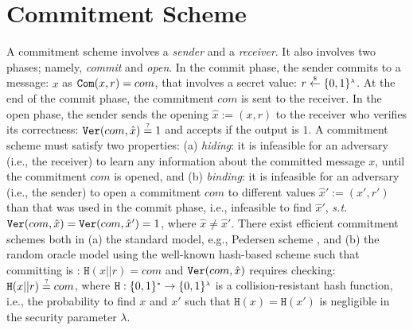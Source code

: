 



\section{Commitment Scheme}\label{subsec:commit}


 A commitment scheme involves a  \emph{sender} and a \emph{receiver}. It also  involves  two phases; namely, \emph{commit} and  \emph{open}. In the commit phase, the sender  commits to a message: $x$ as $\mathtt{Com}(x,r)=com$, that involves a secret value: $r\stackrel{\scriptscriptstyle\$}\leftarrow \{0,1\}^{\scriptscriptstyle\lambda}$. At the end of the commit phase,  the commitment ${com}$ is sent to the receiver. In the open phase, the sender sends the opening $\hat{x}:=(x, r)$ to the receiver who verifies its correctness: $\mathtt{Ver}({com},\hat{x})\stackrel{\scriptscriptstyle ?}=1$ and accepts if the output is $1$.  A commitment scheme must satisfy two properties: (a) \textit{hiding}: it is infeasible for an adversary (i.e., the receiver) to learn any information about the committed  message $x$, until the commitment ${com}$ is opened, and (b) \textit{binding}: it is infeasible for an adversary (i.e., the sender) to open a commitment ${com}$ to different values $\hat{x}':=(x',r')$ than that was  used in the commit phase, i.e., infeasible to find  $\hat{x}'$, \textit{s.t.} $\mathtt{Ver}({com},\hat{x})=\mathtt{Ver}({com},\hat{x}')=1$, where $\hat{x}\neq \hat{x}'$.  There exist efficient  commitment schemes both in (a) the standard model, e.g., Pedersen scheme \cite{Pedersen91}, and (b)  the random oracle model using the well-known hash-based scheme such that committing  is : $\mathtt{H}(x||r)={com}$ and $\mathtt{Ver}({com},\hat{x})$ requires checking: $\mathtt{H}(x||r)\stackrel{\scriptscriptstyle ?}={com}$, where $\mathtt{H}:\{0,1\}^{\scriptscriptstyle *}\rightarrow \{0,1\}^{\scriptscriptstyle\lambda}$ is a collision-resistant hash function, i.e., the probability to find $x$ and $x'$ such that $\mathtt{H}(x)=\mathtt{H}(x')$ is negligible in the security parameter $\lambda$.